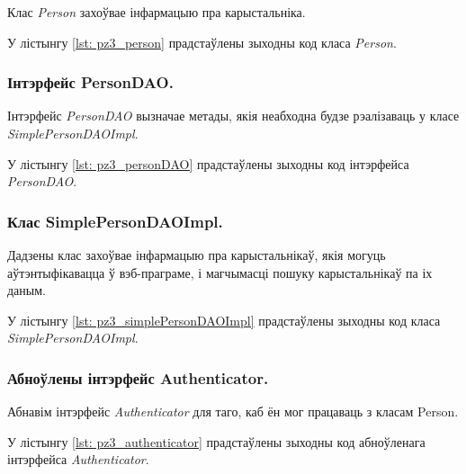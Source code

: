 Клас \textit{Person} захоўвае інфармацыю пра карыстальніка.

У лістынгу \ref{lst: pz3_person} прадстаўлены зыходны код класа \textit{Person}.



\vspace{-\baselineskip}
\subsubsection{Інтэрфейс PersonDAO.}

Інтэрфейс \textit{PersonDAO} вызначае метады, якія неабходна
будзе рэалізаваць у класе \textit{Simp\-le\-Per\-son\-DAO\-Impl}.

У лістынгу \ref{lst: pz3_personDAO} прадстаўлены зыходны код інтэрфейса \textit{PersonDAO}.



\vspace{-\baselineskip}
\subsubsection{Клас SimplePersonDAOImpl.}

Дадзены клас захоўвае інфармацыю пра карыстальнікаў,
якія могуць аўтэнтыфікавацца ў вэб-праграме, і магчымасці
пошуку карыстальнікаў па іх даным.

У лістынгу \ref{lst: pz3_simplePersonDAOImpl} прадстаўлены зыходны код класа \textit{SimplePersonDAOImpl}.



\subsubsection{Абноўлены інтэрфейс Authenticator.}

Абнавім інтэрфейс \textit{Authenticator} для таго,
каб ён мог працаваць з класам Person.

У лістынгу \ref{lst: pz3_authenticator} прадстаўлены зыходны код абноўленага інтэрфейса \textit{Authenticator}.

